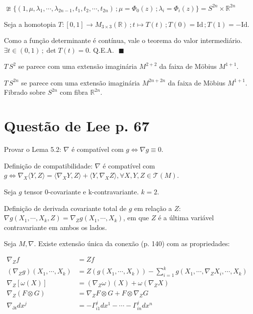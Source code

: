 \documentclass[10pt,a4paper]{article}
\begin{document}
		$\ncong \{ (1, \mu, \lambda_1, \cdots, \lambda_{2n - 1}, t_1, t_2, \cdots, t_{2n}) \,; \mu = \Phi_0(z) \,; \lambda_i = \Phi_i(z) \} = S^{2n} \times \mathbb{R}^{2n}$

		Seja a homotopia $T : [0, 1] \rightarrow M_{3 \times 3} (\mathbb{R}) \,; t \mapsto T(t) \,; T(0) = \text{Id} \,; T(1) = - \text{Id}$.

		Como a fun\c{c}\~ao determinante \'e cont\'inua, vale o teorema do valor intermedi\'ario. $\exists t \in (0, 1) \,; \det T(t) = 0$. Q.E.A. $\,\,\blacksquare$

		$T\,S^2$ se parece com uma extens\~ao imagin\'aria $M^{2+2}$ da faixa de M\"obius $M^{1+1}$.

		$T\,S^{2n}$ se parece com uma extens\~ao imagin\'aria $M^{2n + 2n}$ da faixa de M\"obius $M^{1+1}$. Fibrado sobre $S^{2n}$ com fibra $\mathbb{R}^{2n}$.

	\section{Quest\~ao de Lee p. 67}
		\begin{flushright}
		\end{flushright}

		Provar o Lema 5.2: $\nabla$ \'e compat\'ivel com $g \Leftrightarrow \nabla g \equiv 0$.

		Defini\c{c}\~ao de compatibilidade: $\nabla$ \'e compat\'ivel com $g \Leftrightarrow \nabla_X \langle Y, Z \rangle = \langle \nabla_X Y, Z \rangle + \langle Y, \nabla_X Z \rangle, \forall X, Y, Z \in \mathcal{T}(M)$.

		Seja $g$ tensor 0-covariante e k-contravariante. $k = 2$.

		Defini\c{c}\~ao de derivada covariante total de $g$ em rela\c{c}\~ao a $Z$: $\nabla g(X_1,\cdots,X_k, Z) = \nabla_{Z} g(X_1,\cdots,X_k)$, em que $Z$ \'e a \'ultima vari\'avel contravariante em ambos os lados.

		Seja $M, \nabla$. Existe extens\~ao \'unica da conex\~ao (p. 140) com as propriedades:

		\begin{align}
		\nabla_Z f &= Zf \label{conecta_tpm_f} \\
		(\nabla_Z g)(X_1, \cdots, X_k) &= Z(g(X_1, \cdots, X_k)) - \sum_{i=1}^k g(X_1, \cdots, \nabla_Z X_i, \cdots, X_k) \label{seis_um_b} \\
		\nabla_Z [\omega(X)] &= (\nabla_Z \omega)(X) + \omega(\nabla_Z X) \nonumber \\
		\nabla_Z (F \otimes G) &= \nabla_Z F \otimes G + F \otimes \nabla_Z G \nonumber \\
		\nabla_{\partial i} dx^j &= - \Gamma_{i1}^j dx^1 - \cdots - \Gamma_{in}^j dx^n \nonumber
		\end{align}
\end{document}
